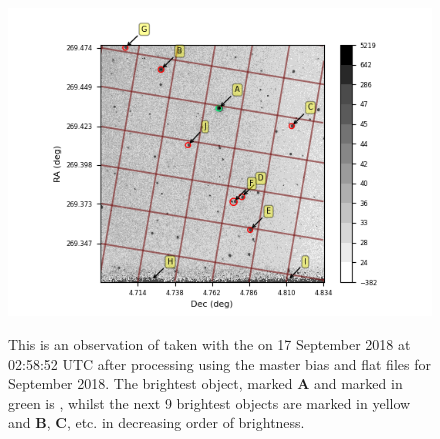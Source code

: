 \begin{figure}[!htbp]
\begin{center}
\includegraphics[scale=1]{images/initgexample.png}
\end{center}
\caption{This is an observation of {\bstar} taken with the {\gfilter} on
17 September 2018 at 02:58:52 UTC after processing using the master bias and
flat files for September 2018. The brightest object, marked \textbf{A} and marked in
green is \bstar, whilst the next 9 brightest objects are marked in yellow and
\textbf{B}, \textbf{C}, etc. in decreasing order of brightness.}
\protect\label{fig:initgexample}
\end{figure}

